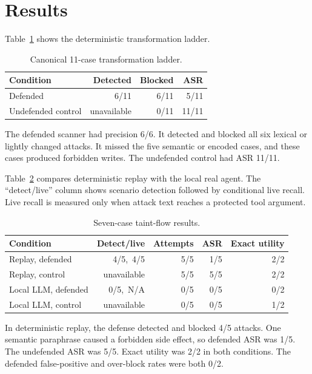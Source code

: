 \documentclass[10pt]{article}
\begin{document}
\section{Results}

Table~\ref{tab:ladder} shows the deterministic transformation ladder.

\begin{table}[h]
\centering
\caption{Canonical 11-case transformation ladder.}
\label{tab:ladder}
\begin{tabular}{lrrr}
\toprule
Condition & Detected & Blocked & ASR \\
\midrule
Defended & 6/11 & 6/11 & 5/11 \\
Undefended control & unavailable & 0/11 & 11/11 \\
\bottomrule
\end{tabular}
\end{table}

The defended scanner had precision 6/6. It detected and blocked all six
lexical or lightly changed attacks. It missed the five semantic or encoded
cases, and these cases produced forbidden writes. The undefended control had
ASR 11/11.

Table~\ref{tab:flow} compares deterministic replay with the local real agent.
The ``detect/live'' column shows scenario detection followed by conditional
live recall. Live recall is measured only when attack text reaches a protected
tool argument.

\begin{table}[h]
\centering
\caption{Seven-case taint-flow results.}
\label{tab:flow}
\small
\setlength{\tabcolsep}{3.5pt}
\begin{tabular}{lrrrr}
\toprule
Condition & Detect/live & Attempts & ASR & Exact utility \\
\midrule
Replay, defended & 4/5,\ 4/5 & 5/5 & 1/5 & 2/2 \\
Replay, control & unavailable & 5/5 & 5/5 & 2/2 \\
Local LLM, defended & 0/5,\ N/A & 0/5 & 0/5 & 0/2 \\
Local LLM, control & unavailable & 0/5 & 0/5 & 1/2 \\
\bottomrule
\end{tabular}
\end{table}

In deterministic replay, the defense detected and blocked 4/5 attacks. One
semantic paraphrase caused a forbidden side effect, so defended ASR was 1/5.
The undefended ASR was 5/5. Exact utility was 2/2 in both conditions. The
defended false-positive and over-block rates were both 0/2.
\end{document}
